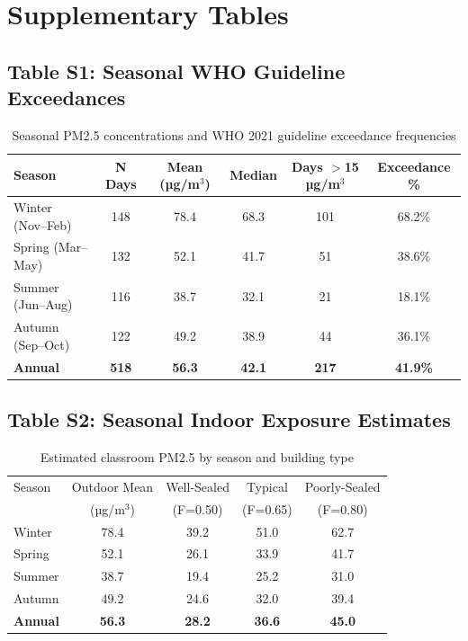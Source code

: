 \documentclass[11pt,a4paper]{article}
\begin{document}
\section{Supplementary Tables}

\subsection{Table S1: Seasonal WHO Guideline Exceedances}

\begin{table}[H]
\centering
\caption{Seasonal PM2.5 concentrations and WHO 2021 guideline exceedance frequencies}
\begin{tabular}{lccccc}
\toprule
Season & N Days & Mean (µg/m$^3$) & Median & Days $>$15 µg/m$^3$ & Exceedance \% \\
\midrule
Winter (Nov--Feb) & 148 & 78.4 & 68.3 & 101 & 68.2\% \\
Spring (Mar--May) & 132 & 52.1 & 41.7 & 51 & 38.6\% \\
Summer (Jun--Aug) & 116 & 38.7 & 32.1 & 21 & 18.1\% \\
Autumn (Sep--Oct) & 122 & 49.2 & 38.9 & 44 & 36.1\% \\
\addlinespace
\textbf{Annual} & \textbf{518} & \textbf{56.3} & \textbf{42.1} & \textbf{217} & \textbf{41.9\%} \\
\bottomrule
\end{tabular}
\end{table}

\subsection{Table S2: Seasonal Indoor Exposure Estimates}

\begin{table}[H]
\centering
\caption{Estimated classroom PM2.5 by season and building type}
\begin{tabular}{lcccc}
\toprule
Season & Outdoor Mean & Well-Sealed & Typical & Poorly-Sealed \\
 & (µg/m$^3$) & (F=0.50) & (F=0.65) & (F=0.80) \\
\midrule
Winter & 78.4 & 39.2 & 51.0 & 62.7 \\
Spring & 52.1 & 26.1 & 33.9 & 41.7 \\
Summer & 38.7 & 19.4 & 25.2 & 31.0 \\
Autumn & 49.2 & 24.6 & 32.0 & 39.4 \\
\addlinespace
\textbf{Annual} & \textbf{56.3} & \textbf{28.2} & \textbf{36.6} & \textbf{45.0} \\
\bottomrule
\end{tabular}
\end{table}
\end{document}
